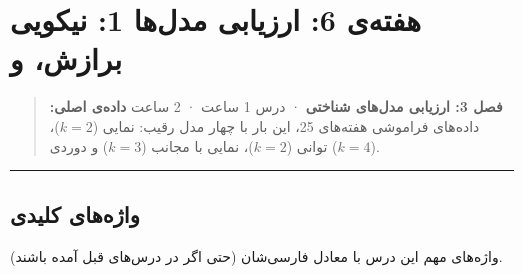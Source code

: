 \section{\texorpdfstring{هفته‌ی 6: ارزیابی مدل‌ها 1: نیکویی برازش،
 و
}{هفته‌ی 6: ارزیابی مدل‌ها 1: نیکویی برازش، overfitting و cross-validation}}

\begin{quote}
\textbf{فصل 3: ارزیابی مدل‌های شناختی} · درس 1 ساعت ·  2 ساعت
\textbf{داده‌ی اصلی:} داده‌های فراموشی هفته‌های 2\lr{--}5، این بار با چهار مدل
رقیب: نمایی (\(k=2\))، توانی (\(k=2\))، نمایی با مجانب (\(k=3\)) و دوردی
(\(k=4\)).
\end{quote}

\begin{center}\rule{0.5\linewidth}{0.5pt}\end{center}

\subsection{واژه‌های کلیدی}

واژه‌های مهم این درس با معادل فارسی‌شان (حتی اگر در درس‌های قبل آمده
باشند).

